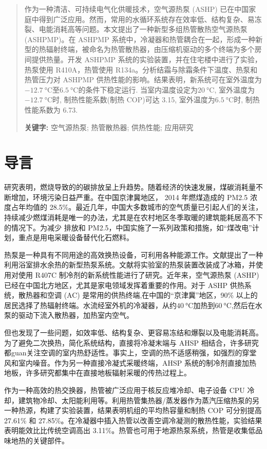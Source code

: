 \begin{abstract}
作为一种清洁、可持续电气化供暖技术，空气源热泵 (ASHP) 已在中国家庭中得到广泛应用。然而，常用的水循环系统存在效率低、结构复杂、易冻裂、电能消耗高等问题。本文提出了一种新型多组热管散热空气源热泵 (ASHPMP)。在 ASHPMP 系统中，冷凝器和热管耦合在一起，形成一种新型的热辐射终端，被命名为热管散热器，由压缩机驱动的多个终端为多个房间提供热量。开发 ASHPMP 系统的实验装置，并在住宅楼中进行了实验，热泵使用 R410A，热管使用 R134a。分析结霜与除霜条件下温度、热泵和热管压力对 ASHPMP 供热性能的影响。结果表明，新系统可在室外温度为$\qty{-12.7}{\degreeCelsius} $至$\qty{6.5}{\degreeCelsius} $的条件下稳定运行. 当室内温度设定为$\qty{20}{\degreeCelsius} $, 室外温度为$\qty{-12.7}{\degreeCelsius} $时, 制热性能系数(制热 COP)可达 3.15, 室外温度为$\qty{6.5}{\degreeCelsius} $时, 制热性能系数为 6.73.

\noindent \textbf{关键字:} 空气源热泵; 热管散热器; 供热性能; 应用研究
\end{abstract}

\section{导言}
研究表明，燃烧导致的的碳排放呈上升趋势。随着经济的快速发展，煤碳消耗量不断增加，环境污染日益严重。在中国京津冀地区， 2014 年燃煤造成的 PM2.5 浓度占年均值的 28.5\%。最近几年，中国大多数城市的空气质量已引起人们的关注，持续减少燃煤消耗是唯一的办法，尤其是在农村地区冬季取暖的建筑能耗居高不下的情况下。为减少  排放和 PM2.5，中国实施了一系列政策和措施，如“煤改电”计划，重点是用电采暖设备替代化石燃料。

热泵是一种具有不同用途的高效换热设备，可利用各种能源工作。文献提出了一种利用浴室排水余热的新型热泵系统。文献将实验室的热泵装置改装成了冰箱，并使用对使用 R407C 制冷剂的新系统性能进行了研究。近年来，空气源热泵 (ASHP) 已经在中国北方地区，尤其是家电领域发挥着重要的作用。对于 ASHP 供热系统，散热器和空调 (AC) 是常用的供热终端,在中国的“京津冀”地区，90\% 以上的居民选择了热辐射终端。水流经室外机的冷凝器，从约$\qty{40}{\degreeCelsius}$加热到$\qty{60}{\degreeCelsius}$,然后在水泵的驱动下流入散热器，加热室内空气。

但也发现了一些问题，如效率低、结构复杂、更容易冻结和爆裂以及电能消耗高。为了避免二次换热，简化系统结构，直接将冷凝末端与 AHSP 相结合，许多研究都guan关注空调的室内热舒适性。事实上，空调的热不适感稍强，如强烈的穿堂风和室内噪音。作为另一种直接冷凝式采暖终端，AHSP 系统的制冷剂直接加热地板，许多研究都集中在直接地板辐射采暖的传热过程上。

作为一种高效的热交换器，热管被广泛应用于核反应堆冷却、电子设备 CPU 冷却，建筑物冷却、太阳能利用等。利用热管集热器/蒸发器作为蒸汽压缩热泵的另一种热源，构建了实验装置，结果表明机组的平均热容量和制热 COP 可分别提高 27.61\% 和 27.85\%。在冷凝器中插入热管以改善空调冷凝测的散热性能，实验结果表明能效比比传统空调高出 3.11\%。热管也可用于地源热泵系统，热管是收集低品味地热的关键部件。

